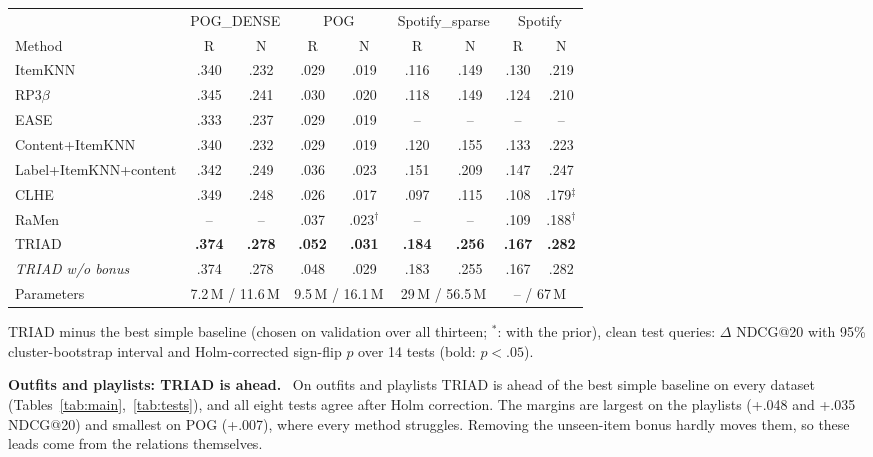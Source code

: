 \documentclass[runningheads]{llncs}
\renewcommand{\paragraph}[1]{\smallskip\noindent\textbf{#1}\ }
\begin{document}
\begin{table}[t]
\medskip
\begin{tabular}{lcccccccc}
\toprule
 & \multicolumn{2}{c}{POG\_DENSE} & \multicolumn{2}{c}{POG} & \multicolumn{2}{c}{Spotify\_sparse} & \multicolumn{2}{c}{Spotify}\\
\cmidrule(lr){2-3}\cmidrule(lr){4-5}\cmidrule(lr){6-7}\cmidrule(lr){8-9}
Method & R & N & R & N & R & N & R & N\\
\midrule
ItemKNN & .340 & .232 & .029 & .019 & .116 & .149 & .130 & .219\\
RP3$\beta$ & .345 & .241 & .030 & .020 & .118 & .149 & .124 & .210\\
EASE & .333 & .237 & .029 & .019 & -- & -- & -- & --\\
Content+ItemKNN & .340 & .232 & .029 & .019 & .120 & .155 & .133 & .223\\
Label+ItemKNN+content & .342 & .249 & .036 & .023 & .151 & .209 & .147 & .247\\
\midrule
CLHE & .349 & .248 & .026 & .017 & .097 & .115 & .108 & .179$^\ddagger$\\
RaMen & -- & -- & .037 & .023$^\dagger$ & -- & -- & .109 & .188$^\dagger$\\
\midrule
TRIAD & \textbf{.374} & \textbf{.278} & \textbf{.052} & \textbf{.031} & \textbf{.184} & \textbf{.256} & \textbf{.167} & \textbf{.282}\\
\emph{TRIAD w/o bonus} & .374 & .278 & .048 & .029 & .183 & .255 & .167 & .282\\
\midrule
Parameters & \multicolumn{2}{c}{7.2\,M / 11.6\,M} & \multicolumn{2}{c}{9.5\,M / 16.1\,M} & \multicolumn{2}{c}{29\,M / 56.5\,M} & \multicolumn{2}{c}{-- / 67\,M}\\
\bottomrule
\end{tabular}
\end{table}

\begin{table}[t]
\centering
\caption{TRIAD minus the best simple baseline (chosen on validation over all thirteen; $^{*}$: with the prior), clean
test queries: $\Delta$ NDCG@20 with 95\% cluster-bootstrap interval and Holm-corrected sign-flip $p$ over 14 tests
(bold: $p<.05$).}
\label{tab:tests}
\setlength{\tabcolsep}{1.6pt}
\scriptsize

\end{table}

\paragraph{Outfits and playlists: TRIAD is ahead.} On outfits and playlists TRIAD is ahead of the best simple baseline on every dataset
(Tables~\ref{tab:main},~\ref{tab:tests}), and all eight tests agree after Holm correction. The margins are largest on the playlists (+.048 and +.035 NDCG@20)
and smallest on POG (+.007), where every method struggles. Removing the unseen-item bonus hardly moves them, so these
leads come from the relations themselves.
\end{document}

